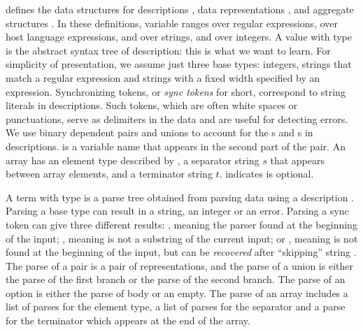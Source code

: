 
 defines
the data structures for descriptions , data
representations , and aggregate structures .
In these definitions,  variable  ranges over regular expressions,
 over host language expressions,
 and  over strings, and  over integers.
A value with type  is the abstract syntax tree of \pads{}
description: this is what we want to learn.  
For simplicity of presentation, we assume just three base types: 
integers, strings that match a regular expression and strings with a
fixed width specified by an expression. Synchronizing
tokens, or {\em sync tokens} for short, correspond to string literals
in \pads{} descriptions.  Such tokens, which are often
white spaces or punctuations,
serve as delimiters in the data and are useful for detecting
errors. We use binary dependent pairs and unions to account for the
s and s in \padsc{} descriptions. 
 is a variable name that appears in the second part of the pair.
An array has an element type described by , a separator
string $s$ that appears between array elements, and a
terminator string $t$.  indicates  is optional.

A term with type  is a parse tree obtained from parsing 
data using a description .  Parsing a base type can result in a
string, an integer or an error.  Parsing a sync token
 can give three different results: , meaning the
parser found  at the beginning of the input; , meaning
 is not a substring of the current input; or ,
meaning  is not found at the beginning of the input, but
can be {\em recovered} after ``skipping'' string .  The parse
of a pair is a pair of representations, and the parse of a union is
either the parse of the first branch or the parse of the second
branch. The parse of an option is either the parse of body or an empty.
The parse of an array includes a list of parses for the
element type, a list of parses for the separator and a parse for the
terminator which appears at the end of the array.

